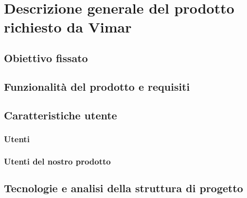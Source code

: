 \section{Descrizione generale del prodotto richiesto da Vimar}
\subsection{Obiettivo fissato}
\subsection{Funzionalità del prodotto e requisiti}
\subsection{Caratteristiche utente}
\subsubsection{Utenti}
\subsubsection{Utenti del nostro prodotto}
\subsection{Tecnologie  e analisi della struttura di progetto}